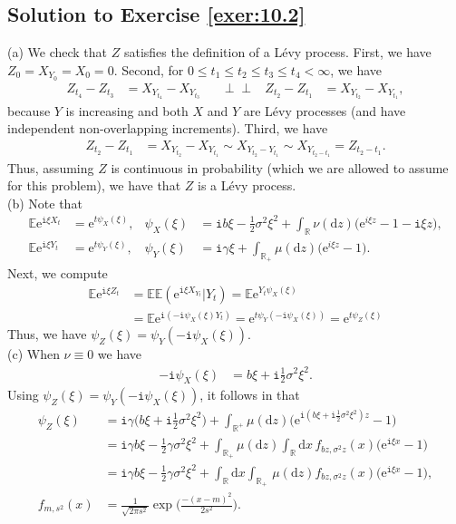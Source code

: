 \documentclass[12pt]{book}
\numberwithin{equation}{chapter}
\theoremstyle{plain}
\numberwithin{theorem}{section}
\theoremstyle{definition}
\numberwithin{exercise}{chapter}
\newcommand{\<}{\langle}
\renewcommand{\>}{\rangle}
\renewcommand{\(}{\left(}
\renewcommand{\)}{\right)}
\renewcommand{\[}{\left[}
\renewcommand{\]}{\right]}
\newcommand\Eb{\mathds{E}}
\newcommand\Rb{\mathds{R}}
\newcommand\sig{\sigma}
\newcommand\gam{\gamma}
\newcommand{\ind}{\perp \! \! \! \perp}
\newcommand\ii{\mathtt{i}}
\newcommand\dd{\mathrm{d}}
\newcommand\ee{\mathrm{e}}
\begin{document}
\subsection*{Solution to Exercise \ref{exer:10.2}}
(a)  We check that $Z$ satisfies the definition of a L\'evy process.  First, we have $Z_0 = X_{Y_0} = X_0 = 0$.  Second, for $0 \leq t_1 \leq t_2 \leq t_3 \leq t_4 < \infty$, we have 
\begin{align}
Z_{t_4} - Z_{t_3} 
	&= X_{Y_{t_4}} - X_{Y_{t_3}} &
	&\ind&
Z_{t_2} - Z_{t_1} 
	&= X_{Y_{t_2}} - X_{Y_{t_1}} ,
\end{align}
because $Y$ is increasing and both $X$ and $Y$ are L\'evy processes (and have independent non-overlapping increments).  Third, we have
\begin{align}
Z_{t_2} - Z_{t_1} 
	&= X_{Y_{t_2}} - X_{Y_{t_1}}
	\sim  X_{Y_{t_2} - Y_{t_1}}
	\sim 	X_{Y_{t_2 - t_1}} 
	=		Z_{t_2 - t_1} .
\end{align}
Thus, assuming $Z$ is continuous in probability (which we are allowed to assume for this problem), we have that $Z$ is a L\'evy process.\\
(b) Note that
\begin{align}
\Eb \ee^{\ii \xi X_t}
	&=	\ee^{t \psi_X(\xi)} , &
\psi_X(\xi)
	&=	\ii b \xi - \tfrac{1}{2} \sig^2 \xi^2 + \int_\Rb \nu(\dd z) \Big( \ee^{i \xi z } - 1 - \ii \xi z \Big) , \\
\Eb \ee^{\ii \xi Y_t}
	&=	\ee^{t \psi_Y(\xi)} , &
\psi_Y(\xi)
	&=	\ii \gam \xi + \int_{\Rb_+} \mu(\dd z) \Big( \ee^{i \xi z } - 1 \Big) .
\end{align}
Next, we compute
\begin{align}
\Eb \ee^{\ii \xi Z_t}
	&=	\Eb \Eb ( \ee^{\ii \xi X_{Y_t}} | Y_t )
	=		\Eb \ee^{Y_t \psi_X(\xi)} \\
	&=		\Eb \ee^{\ii ( -\ii \psi_X(\xi) Y_t )}
	=		\ee^{t \psi_Y( - \ii \psi_X(\xi))} 
	=		\ee^{t \psi_Z(\xi)}
\end{align}
Thus, we have $\psi_Z(\xi) = \psi_Y( - \ii \psi_X(\xi))$.\\
(c) When $\nu \equiv 0$ we have
\begin{align}
-\ii \psi_X(\xi)
	&=	b \xi + \ii \tfrac{1}{2} \sig^2 \xi^2 .
\end{align}
Using $\psi_Z(\xi) = \psi_Y( - \ii \psi_X(\xi))$, it follows in that
\begin{align}
\psi_Z(\xi) 
	&=	\ii \gam \Big( b \xi + \ii \tfrac{1}{2} \sig^2 \xi^2 \Big) + \int_{\Rb^+} \mu(\dd z) \Big( \ee^{\ii (b \xi + \ii \tfrac{1}{2} \sig^2 \xi^2) z} - 1 \Big) \\
	&=	\ii \gam b \xi - \tfrac{1}{2} \gam \sig^2 \xi^2 + \int_{\Rb_+} \mu(\dd z) \int_\Rb \dd x \, f_{b z, \sig^2 z}(x) \Big( \ee^{\ii \xi x} - 1 \Big) \\
	&=	\ii \gam b \xi - \tfrac{1}{2} \gam \sig^2 \xi^2 + \int_\Rb \dd x \int_{\Rb_+} \, \mu(\dd z)  f_{b z, \sig^2 z}(x) \Big( \ee^{\ii \xi x} - 1 \Big) , \\
f_{m,s^2}(x)
	&=	\frac{1}{\sqrt{2 \pi s^2}} \exp \Big( \frac{-(x-m)^2}{2 s^2} \Big) .
\end{align}
\end{document}
